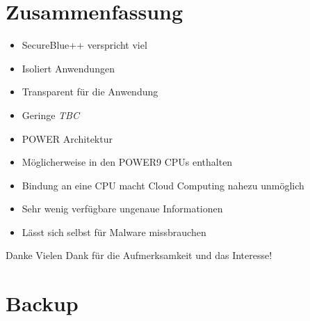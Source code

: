 \documentclass[fleqn,11pt,aspectratio=43,table]{beamer}
\newcommand{\good}{\Large\textcolor{tuGreenDark80}{\faSmileO}}
\newcommand{\bad}{\Large\textcolor{red}{\faFrownO}}%
\begin{document}
\section{Zusammenfassung}
\begin{frame}{\insertsectionhead}
	\begin{itemize}
		\item[\good] SecureBlue++ verspricht viel \vfill
		\item[\good] Isoliert Anwendungen \vfill
		\item[\good] Transparent für die Anwendung \vfill
		\item[\good] Geringe \emph{TBC} \vfill
		\pause
		\item POWER Architektur \vfill
		\item Möglicherweise in den POWER9 CPUs enthalten \vfill
		\item[\bad] Bindung an eine CPU macht Cloud Computing nahezu unmöglich \vfill
		\item[\bad] Sehr wenig verfügbare ungenaue Informationen \vfill
		\item[\bad] Lässt sich selbst für Malware missbrauchen \vfill
	\end{itemize}
\end{frame}


\begin{frame}{Danke}
	\centering
	Vielen Dank für die Aufmerksamkeit und das Interesse!
\end{frame}

\section*{Backup~}
\end{document}
